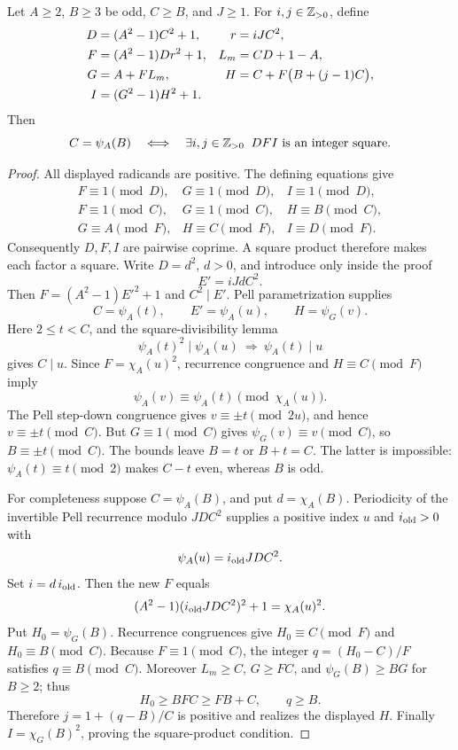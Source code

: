 \begin{lemma}
\label{lem:saturated-positive}
Let \(A\ge2\), \(B\ge3\) be odd, \(C\ge B\), and \(J\ge1\).
For \(i,j\in\mathbb Z_{>0}\), define
\begin{align}
 D&=(A^2-1)C^2+1,& r&=iJC^2,\notag\\
 F&=(A^2-1)Dr^2+1,& L_m&=CD+1-A,\notag\\
 G&=A+FL_m,& H&=C+F\bigl(B+(j-1)C\bigr),\notag\\
 I&=(G^2-1)H^2+1. \label{eq:saturated-pell}
\end{align}
Then
\[
 C=\psi_A(B)
 \quad\Longleftrightarrow\quad
 \exists i,j\in\mathbb Z_{>0}\;\;DFI\text{ is an integer square}.
\]
\end{lemma}

\begin{proof}
All displayed radicands are positive. The defining equations give
\[
\begin{array}{lll}
 F\equiv1\pmod D,&G\equiv1\pmod D,&I\equiv1\pmod D,\\
 F\equiv1\pmod C,&G\equiv1\pmod C,&H\equiv B\pmod C,\\
 G\equiv A\pmod F,&H\equiv C\pmod F,&I\equiv D\pmod F.
\end{array}
\]
Consequently \(D,F,I\) are pairwise coprime. A square product therefore
makes each factor a square. Write \(D=d^2\), \(d>0\), and introduce only
inside the proof
\[
 E'=iJdC^2.
\]
Then \(F=(A^2-1)E'^2+1\) and \(C^2\mid E'\). Pell parametrization supplies
\[
 C=\psi_A(t),\qquad E'=\psi_A(u),\qquad H=\psi_G(v).
\]
Here \(2\le t<C\), and the square-divisibility lemma
\[
 \psi_A(t)^2\mid\psi_A(u)\ \Longrightarrow\ \psi_A(t)\mid u
\]
gives \(C\mid u\). Since \(F=\chi_A(u)^2\), recurrence congruence and
\(H\equiv C\pmod F\) imply
\[
 \psi_A(v)\equiv\psi_A(t)\pmod{\chi_A(u)}.
\]
The Pell step-down congruence gives \(v\equiv\pm t\pmod{2u}\), and hence
\(v\equiv\pm t\pmod C\). But \(G\equiv1\pmod C\) gives
\(\psi_G(v)\equiv v\pmod C\), so \(B\equiv\pm t\pmod C\).
The bounds leave \(B=t\) or \(B+t=C\). The latter is impossible:
\(\psi_A(t)\equiv t\pmod2\) makes \(C-t\) even, whereas \(B\) is odd.

For completeness suppose \(C=\psi_A(B)\), and put \(d=\chi_A(B)\).
Periodicity of the invertible Pell recurrence modulo \(JDC^2\) supplies
a positive index \(u\) and \(i_{\rm old}>0\) with
\[
 \psi_A(u)=i_{\rm old}JDC^2.
\]
Set \(i=d\,i_{\rm old}\). Then the new \(F\) equals
\[
 (A^2-1)(i_{\rm old}JDC^2)^2+1=\chi_A(u)^2.
\]
Put \(H_0=\psi_G(B)\). Recurrence congruences give
\(H_0\equiv C\pmod F\) and \(H_0\equiv B\pmod C\).
Because \(F\equiv1\pmod C\), the integer \(q=(H_0-C)/F\) satisfies
\(q\equiv B\pmod C\). Moreover \(L_m\ge C\), \(G\ge FC\), and
\(\psi_G(B)\ge BG\) for \(B\ge2\); thus
\[
 H_0\ge BFC\ge FB+C,\qquad q\ge B.
\]
Therefore \(j=1+(q-B)/C\) is positive and realizes the displayed \(H\).
Finally \(I=\chi_G(B)^2\), proving the square-product condition.
\end{proof}

